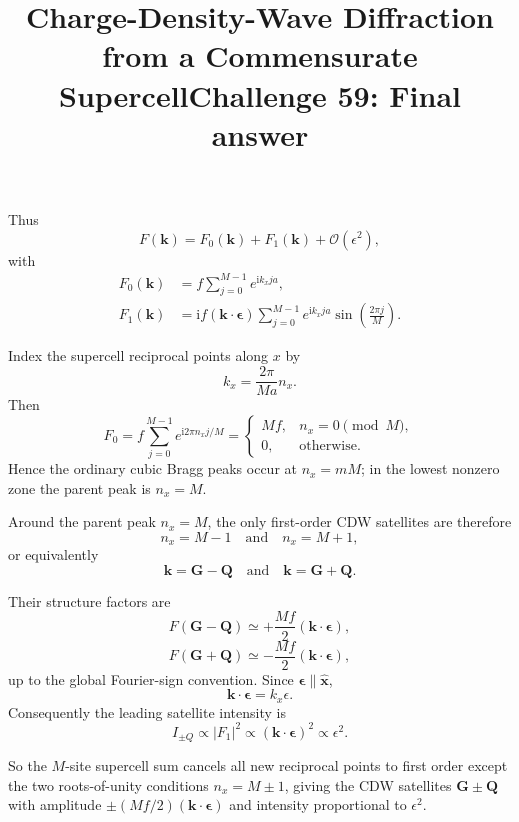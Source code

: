 \documentclass[11pt]{article}
\title{\vspace{-1.2cm}Charge-Density-Wave Diffraction from a Commensurate Supercell}
\author{}
\date{}
\title{Challenge 59: Final answer}
\author{}
\newcommand{\e}{\epsilon}
\newcommand{\ii}{\mathrm{i}}
\newcommand{\bG}{\mathbf{G}}
\newcommand{\bQ}{\mathbf{Q}}
\newcommand{\bk}{\mathbf{k}}
\newcommand{\cO}{\mathcal{O}}
\begin{document}
\maketitle
Thus
\begin{equation}
    F(\bk)=F_0(\bk)+F_1(\bk)+\cO(\e^2),
\end{equation}
with
\begin{align}
F_0(\bk)
&=f\sum_{j=0}^{M-1}e^{\ii k_xja},\\
F_1(\bk)
&=\ii f(\bk\cdot\bm{\e})
  \sum_{j=0}^{M-1}e^{\ii k_xja}
  \sin\!\left(\frac{2\pi j}{M}\right).
\end{align}

Index the supercell reciprocal points along $x$ by
\begin{equation}
    k_x=\frac{2\pi}{Ma}n_x.
\end{equation}
Then
\begin{equation}
F_0=f\sum_{j=0}^{M-1}e^{\ii2\pi n_xj/M}
=
\begin{cases}
Mf,&n_x=0\pmod M,\\
0,&\text{otherwise}.
\end{cases}
\end{equation}
Hence the ordinary cubic Bragg peaks occur at $n_x=mM$; in the lowest nonzero zone the parent peak is $n_x=M$.


Around the parent peak $n_x=M$, the only first-order CDW satellites are therefore
\begin{equation}
    \boxed{n_x=M-1\quad\text{and}\quad n_x=M+1},
\end{equation}
or equivalently
\begin{equation}
    \boxed{\bk=\bG-\bQ\quad\text{and}\quad\bk=\bG+\bQ}.
\end{equation}

Their structure factors are
\begin{equation}
    \boxed{
    F(\bG-\bQ)
    \simeq
    +\frac{Mf}{2}(\bk\cdot\bm{\e})
    },
\end{equation}
\begin{equation}
    \boxed{
    F(\bG+\bQ)
    \simeq
    -\frac{Mf}{2}(\bk\cdot\bm{\e})
    },
\end{equation}
up to the global Fourier-sign convention. Since $\bm{\e}\parallel\hat{\mathbf{x}}$,
\begin{equation}
    \bk\cdot\bm{\e}=k_x\e.
\end{equation}
Consequently the leading satellite intensity is
\begin{equation}
    \boxed{I_{\pm Q}\propto |F_1|^2\propto(\bk\cdot\bm{\e})^2\propto\e^2.}
\end{equation}

So the $M$-site supercell sum cancels all new reciprocal points to first order except the two roots-of-unity conditions $n_x=M\pm1$, giving the CDW satellites $\bG\pm\bQ$ with amplitude $\pm(Mf/2)(\bk\cdot\bm{\e})$ and intensity proportional to $\e^2$.
\end{document}

